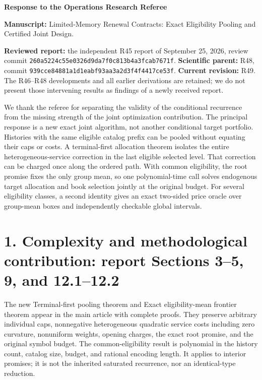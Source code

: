 \documentclass[11pt,letterpaper]{article}
\begin{document}
\begin{center}\Large\bfseries Response to the Operations Research Referee\end{center}


\textbf{Manuscript:} Limited-Memory Renewal Contracts: Exact Eligibility Pooling and Certified Joint Design.



\textbf{Reviewed report:} the independent R45 report of September 25, 2026, review commit \nolinkurl{260a5224c55e0326d9da7f0c813b4a3fcab7671f}. \textbf{Scientific parent:} R48, commit \nolinkurl{939cce84881a1d1eabf93aa3a2d3f4f4417ce53f}. \textbf{Current revision:} R49. The R46–R48 developments and all earlier derivations are retained; we do not present those intervening results as findings of a newly received report.



We thank the referee for separating the validity of the conditional recurrence from the missing strength of the joint optimization contribution. The principal response is a new exact joint algorithm, not another conditional target portfolio. Histories with the same eligible catalog prefix can be pooled without equating their caps or costs. A terminal-first allocation theorem isolates the entire heterogeneous-service correction in the last eligible selected level. That correction can be charged once along the ordered path. With common eligibility, the root promise fixes the only group mean, so one polynomial-time call solves endogenous target allocation and book selection jointly at the original budget. For several eligibility classes, a second identity gives an exact two-sided price oracle over group-mean boxes and independently checkable global intervals.



\section*{1. Complexity and methodological contribution: report Sections 3–5, 9, and 12.1–12.2}


The new Terminal-first pooling theorem and Exact eligibility-mean frontier theorem appear in the main article with complete proofs. They preserve arbitrary individual caps, nonnegative heterogeneous quadratic service costs including zero curvature, nonuniform weights, opening charges, the exact root promise, and the original symbol budget. The common-eligibility result is polynomial in the history count, catalog size, budget, and rational encoding length. It applies to interior promises; it is not the inherited saturated recurrence, nor an identical-type reduction.
\end{document}
